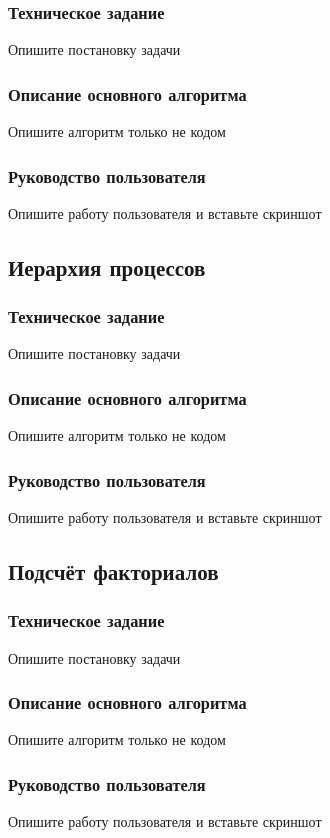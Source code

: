 \documentclass[a4paper,14pt]{extarticle}
\begin{document}
\subsubsection{Техническое задание}
Опишите постановку задачи

\subsubsection{Описание основного алгоритма}
Опишите алгоритм только не кодом

\subsubsection{Руководство пользователя}
Опишите работу пользователя и вставьте скриншот

\subsection{Иерархия процессов}
\subsubsection{Техническое задание}
Опишите постановку задачи

\subsubsection{Описание основного алгоритма}
Опишите алгоритм только не кодом

\subsubsection{Руководство пользователя}
Опишите работу пользователя и вставьте скриншот

\subsection{Подсчёт факториалов}
\subsubsection{Техническое задание}
Опишите постановку задачи

\subsubsection{Описание основного алгоритма}
Опишите алгоритм только не кодом

\subsubsection{Руководство пользователя}
Опишите работу пользователя и вставьте скриншот
\newpage
\end{document}
